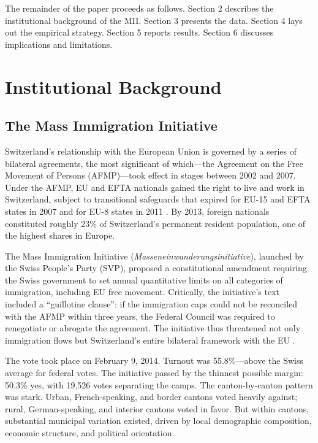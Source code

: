 \documentclass[12pt]{article}
\begin{document}
The remainder of the paper proceeds as follows. Section 2 describes the institutional background of the MII. Section 3 presents the data. Section 4 lays out the empirical strategy. Section 5 reports results. Section 6 discusses implications and limitations.


\section{Institutional Background}

\subsection{The Mass Immigration Initiative}

Switzerland's relationship with the European Union is governed by a series of bilateral agreements, the most significant of which---the Agreement on the Free Movement of Persons (AFMP)---took effect in stages between 2002 and 2007. Under the AFMP, EU and EFTA nationals gained the right to live and work in Switzerland, subject to transitional safeguards that expired for EU-15 and EFTA states in 2007 and for EU-8 states in 2011 \citep{beerli2021}. By 2013, foreign nationals constituted roughly 23\% of Switzerland's permanent resident population, one of the highest shares in Europe.

The Mass Immigration Initiative (\textit{Masseneinwanderungsinitiative}), launched by the Swiss People's Party (SVP), proposed a constitutional amendment requiring the Swiss government to set annual quantitative limits on all categories of immigration, including EU free movement. Critically, the initiative's text included a ``guillotine clause'': if the immigration caps could not be reconciled with the AFMP within three years, the Federal Council was required to renegotiate or abrogate the agreement. The initiative thus threatened not only immigration flows but Switzerland's entire bilateral framework with the EU \citep{helbling2014}.

The vote took place on February 9, 2014. Turnout was 55.8\%---above the Swiss average for federal votes. The initiative passed by the thinnest possible margin: 50.3\% yes, with 19,526 votes separating the camps. The canton-by-canton pattern was stark. Urban, French-speaking, and border cantons voted heavily against; rural, German-speaking, and interior cantons voted in favor. But within cantons, substantial municipal variation existed, driven by local demographic composition, economic structure, and political orientation.
\end{document}

